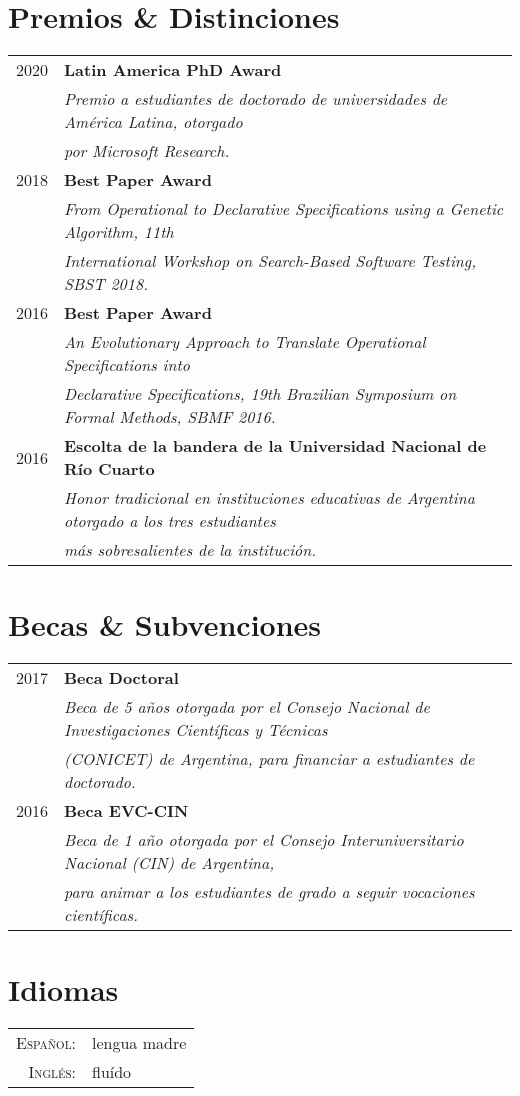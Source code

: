 \documentclass[a4paper,10pt]{article} %
\begin{document}
\section{Premios \& Distinciones}
\begin{longtable}{rl}

\textsc{2020} & \textbf{Latin America PhD Award} \\
& \textit{Premio a estudiantes de doctorado de universidades de América Latina, otorgado} \\
& \textit{por Microsoft Research.} \\

\textsc{2018} & \textbf{Best Paper Award} \\
& \textit{From Operational to Declarative Specifications using a Genetic Algorithm, 11th} \\
& \textit{International Workshop on Search-Based Software Testing, SBST 2018.} \\

\textsc{2016} & \textbf{Best Paper Award} \\
& \textit{An Evolutionary Approach to Translate Operational Specifications into } \\
& \textit{Declarative Specifications, 19th Brazilian Symposium on Formal Methods, SBMF 2016.} \\

\textsc{2016} & \textbf{Escolta de la bandera de la Universidad Nacional de Río Cuarto} \\
& \textit{Honor tradicional en instituciones educativas de Argentina otorgado a los tres estudiantes} \\
& \textit{más sobresalientes de la institución.} \\

\end{longtable}

\section{Becas \& Subvenciones}
\begin{longtable}{rl}

\textsc{2017} & \textbf{Beca Doctoral} \\
& \textit{Beca de 5 años otorgada por el Consejo Nacional de Investigaciones Científicas y Técnicas} \\
& \textit{(CONICET) de Argentina, para financiar a estudiantes de doctorado.} \\

\textsc{2016} & \textbf{Beca EVC-CIN} \\
& \textit{Beca de 1 año otorgada por el Consejo Interuniversitario Nacional (CIN) de Argentina, } \\
& \textit{para animar a los estudiantes de grado a seguir vocaciones científicas.} \\

\end{longtable}

\section{Idiomas}

\begin{tabular}{rl}

\textsc{Español:} & lengua madre \\
\textsc{Inglés:} & fluído \\

\end{tabular}
\end{document}
